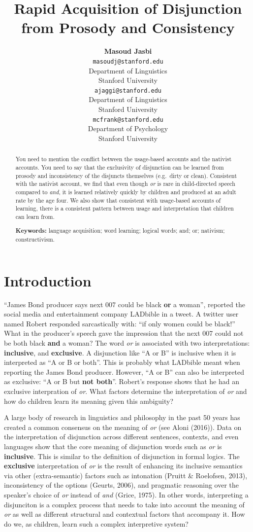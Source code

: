 \documentclass[10pt, letterpaper]{article}
\title{Rapid Acquisition of Disjunction from Prosody and Consistency}
\author{{\large \bf Masoud Jasbi} \\ \texttt{masoudj@stanford.edu} \\ Department of Linguistics \\ Stanford University \And {\large \bf Akshay Jaggi} \\ \texttt{ajaggi@stanford.edu} \\ Department of Linguistics \\ Stanford University \And {\large \bf Michael C. Frank} \\ \texttt{mcfrank@stanford.edu} \\ Department of Psychology \\ Stanford University }
\begin{document}
\maketitle

\begin{abstract}
You need to mention the conflict between the usage-based accounts and
the nativist accounts. You need to say that the exclusivity of
disjunction can be learned from prosody and inconsistency of the
disjuncts themselves (e.g.~dirty or clean). Consistent with the nativist
account, we find that even though \emph{or} is rare in child-directed
speech compared to \emph{and}, it is learned relatively quickly by
children and produced at an adult rate by the age four. We also show
that consistent with usage-based accounts of learning, there is a
consistent pattern between usage and interpretation that children can
learn from.

\textbf{Keywords:}
language acquisition; word learning; logical words; and; or; nativism;
constructivism.
\end{abstract}

\section{Introduction}\label{introduction}

``James Bond producer says next 007 could be black \textbf{or} a
woman'', reported the social media and entertainment company LADbible in
a tweet. A twitter user named Robert responded sarcastically with: ``if
only women could be black!'' What in the producer's speech gave the
impression that the next 007 could not be both black \textbf{and} a
woman? The word \emph{or} is associated with two interpretations:
\textbf{inclusive}, and \textbf{exclusive}. A disjunction like ``A or
B'' is inclusive when it is interpreted as ``A or B or both''. This is
probably what LADbible meant when reporting the James Bond producer.
However, ``A or B'' can also be interpreted as exclusive: ``A or B but
\textbf{not both}''. Robert's response shows that he had an exclusive
interpration of \emph{or}. What factors determine the interpretation of
\emph{or} and how do children learn its meaning given this ambiguity?

A large body of research in linguistics and philosophy in the past 50
years has created a common consensus on the meaning of \emph{or} (see
Aloni (2016)). Data on the interpretation of disjunction across
different sentences, contexts, and even languages show that the core
meaning of disjunction words such as \emph{or} is \textbf{inclusive}.
This is similar to the definition of disjunction in formal logics. The
\textbf{exclusive} interpretation of \emph{or} is the result of
enhancing its inclusive semantics via other (extra-semantic) factors
such as intonation (Pruitt \& Roelofsen, 2013), inconsistency of the
options (Geurts, 2006), and pragmatic reasoning over the speaker's
choice of \emph{or} instead of \emph{and} (Grice, 1975). In other words,
interpreting a disjunciton is a complex process that needs to take into
account the meaning of \emph{or} as well as different structural and
contextual factors that accompany it. How do we, as children, learn such
a complex interpretive system?
\end{document}
